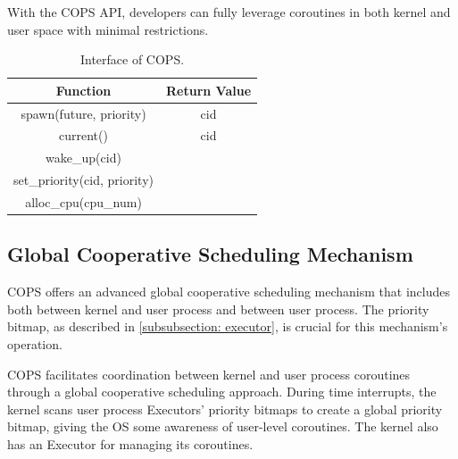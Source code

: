\documentclass[conference]{IEEEtran}
\begin{document}
With the COPS API, developers can fully leverage coroutines in both kernel and user space with minimal restrictions.

\begin{table}[htbp]
  \centering
  \begin{tabular}{@{}cc@{}}
  \toprule
  Function                     & Return Value \\ \midrule
  spawn(future, priority)      & cid          \\
  current()                    & cid          \\
  wake\_up(cid)                &              \\
  set\_priority(cid, priority) &              \\
  alloc\_cpu(cpu\_num)          &              \\ \bottomrule
  \end{tabular}
  \caption{Interface of COPS.}
  \label{tab:interface}
  \vspace{-1em}
\end{table}

\subsection{Global Cooperative Scheduling Mechanism}
\label{section: global-cooperative-scheduling}

COPS offers an advanced global cooperative scheduling mechanism that includes both between kernel and user process and between user process. The priority bitmap, as described in \ref{subsubsection: executor}, is crucial for this mechanism's operation.

COPS facilitates coordination between kernel and user process coroutines through a global cooperative scheduling approach. During time interrupts, the kernel scans user process Executors' priority bitmaps to create a global priority bitmap, giving the OS some awareness of user-level coroutines. The kernel also has an Executor for managing its coroutines.
\end{document}
